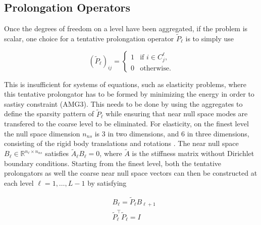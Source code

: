 \subsection{Prolongation Operators}

Once the degrees of freedom on a level have been aggregated, if the problem is scalar, one choice for a tentative prolongation operator $\tilde{P}_\ell$ is to simply use

\begin{equation}
	\left(\tilde P_\ell \right)_{ij} =
	\begin{cases}
		1 & \text{if $i \in C_j^\ell$}, \\
		0 & \text{otherwise}.
	\end{cases}
\end{equation}

This is insufficient for systems of equations, such as elasticity problems, where this tentative prolongator has to be formed by minimizing the energy in order to sastisy constraint (AMG3). This needs to be done by using the aggregates to define the sparsity pattern of $\tilde{P}_\ell$ while ensuring that near null space modes are transfered to the coarse level to be eliminated. For elasticity, on the finest level the null space dimension $n_{ns}$ is 3 in two dimensions, and 6 in three dimensions, consisting of the rigid body translations and rotations \cite{Gee2009}. The near null space $B_\ell \in \mathbb{R}^{n_\ell \times n_{ns}}$ satisfies $\tilde{A}_\ell B_\ell = 0$, where $\tilde{A}$ is the stiffness matrix without Dirichlet boundary conditions. Starting from the finest level, both the tentative prolongators as well the coarse near null space vectors can then be constructed at each level $\ell = 1, \ldots, L - 1$ by satisfying

\begin{equation}
	\label{eq:prolongator_req}
	\begin{aligned}
	& B_\ell = \tilde{P}_\ell B_{\ell+1} \\
	& \tilde{P}_\ell^\top \tilde{P}_\ell = I
	\end{aligned}
\end{equation}

